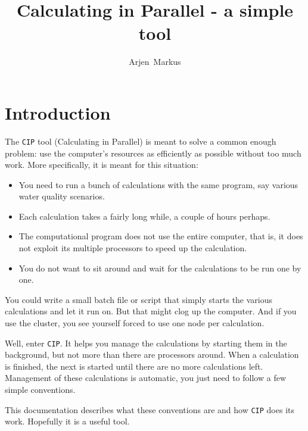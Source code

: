 \documentclass[onecolumn]{article}
\begin{document}
\title{Calculating in Parallel - a simple tool}

\author{Arjen~Markus}

\maketitle

\section{Introduction}
The \verb+CIP+ tool (Calculating in Parallel) is meant to solve a
common enough problem: use the computer's resources as efficiently as
possible without too much work. More specifically, it is meant for
this situation:
\begin{itemize}
\item
You need to run a bunch of calculations with the same program, say
various water quality scenarios.
\item
Each calculation takes a fairly long while, a couple of hours perhaps.
\item
The computational program does not use the entire computer, that is,
it does not exploit its multiple processors to speed up the
calculation.
\item
You do not want to sit around and wait for the calculations to be run
one by one.
\end{itemize}
You could write a small batch file or script that simply starts the
various calculations and let it run on. But that might clog up the
computer. And if you use the cluster, you see yourself forced to
use one node per calculation.

Well, enter \verb+CIP+. It helps you manage the calculations by
starting them in the background, but not more than there are
processors around. When a calculation is finished, the next is started
until there are no more calculations left. Management of these
calculations is automatic, you just need to follow a few simple
conventions.

This documentation describes what these conventions are and how
\verb+CIP+ does its work. Hopefully it is a useful tool.
\end{document}
